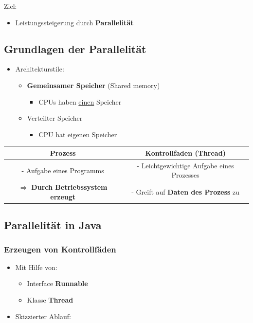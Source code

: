 \documentclass[parskip=full, 12pt]{scrartcl}
\begin{document}
		Ziel:
				
		\begin{itemize}
			\item Leistungssteigerung durch \textbf{Parallelität}
		\end{itemize}
	
		\subsection{Grundlagen der Parallelität}
	
			\begin{itemize}
				\item Architekturstile:
				\begin{itemize}
					\item \textbf{Gemeinsamer Speicher} (Shared memory)
					\begin{itemize}
						\item CPUs haben \underline{einen} Speicher
					\end{itemize}
					\item Verteilter Speicher
					\begin{itemize}
						\item CPU hat eigenen Speicher
					\end{itemize}
				\end{itemize}
			\end{itemize}
		
			\begin{center}
				\begin{tabular}{c|c}
					Prozess & Kontrollfaden (Thread) \\
					\hline
					- Aufgabe eines Programms & - Leichtgewichtige Aufgabe eines Prozesses \\
					$\Rightarrow$ \textbf{Durch Betriebssystem erzeugt} & - Greift auf \textbf{Daten des Prozess} zu \\
				\end{tabular}
			\end{center}
	
		\subsection{Parallelität in Java}
		
			\subsubsection{Erzeugen von Kontrollfäden}
			
				\begin{itemize}
					\item Mit Hilfe von:
					\begin{itemize}
						\item Interface \textbf{Runnable}
						\item Klasse \textbf{Thread}
					\end{itemize}
					\newpage
					\item Skizzierter Ablauf:			
				\end{itemize}
			
\end{document}
